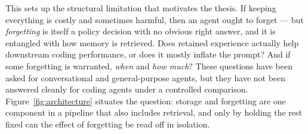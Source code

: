 This sets up the structural limitation that motivates the thesis. If keeping everything is
costly and sometimes harmful, then an agent ought to forget --- but \emph{forgetting} is
itself a policy decision with no obvious right answer, and it is entangled with how memory
is retrieved. Does retained experience actually help downstream coding performance, or does
it mostly inflate the prompt? And if some forgetting is warranted, \emph{when} and
\emph{how much}? These questions have been asked for conversational and
general-purpose agents, but they have not been answered cleanly for coding agents under a
controlled comparison. Figure~\ref{fig:architecture} situates the question: storage and
forgetting are one component in a pipeline that also includes retrieval, and only by
holding the rest fixed can the effect of forgetting be read off in isolation.
